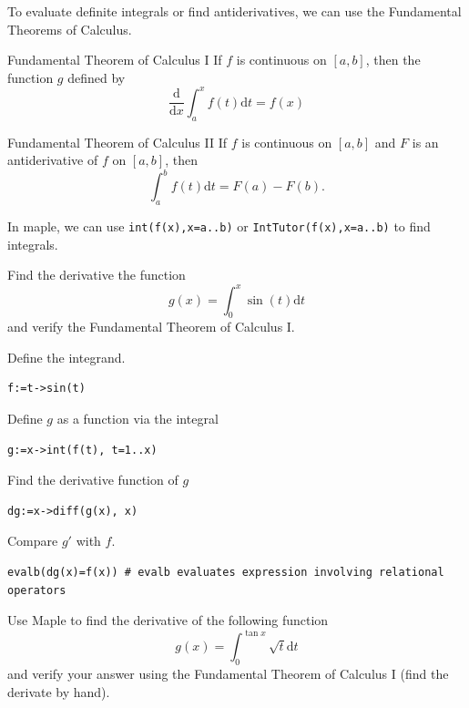 \documentclass[en,11pt,simple]{elegantbook}
\let\BeginKnitrBlock\begin \let\EndKnitrBlock\end
\begin{document}
To evaluate definite integrals or find antiderivatives, we can use the Fundamental Theorems of Calculus.

\BeginKnitrBlock{theorem}{Fundamental Theorem of Calculus I}{}
\protect\hypertarget{thm:unnamed-chunk-138}{}{\label{thm:unnamed-chunk-138} {} }
If \(f\) is continuous on \([a, b]\), then the function \(g\) defined by
\[
\dfrac{\mathrm{d}}{\mathrm{d} x}\int^x_af(t)\mathrm{d} t =f(x)
\]
\EndKnitrBlock{theorem}

\BeginKnitrBlock{theorem}{Fundamental Theorem of Calculus II}{}
\protect\hypertarget{thm:unnamed-chunk-139}{}{\label{thm:unnamed-chunk-139} {} }
If \(f\) is continuous on \([a, b]\) and \(F\) is an antiderivative of \(f\) on \([a, b]\), then
\[
\int^b_af(t)\mathrm{d} t =F(a)-F(b).
\]
\EndKnitrBlock{theorem}

In maple, we can use \texttt{int(f(x),x=a..b)} or \texttt{IntTutor(f(x),x=a..b)} to find integrals.

\BeginKnitrBlock{example}{}{}
\protect\hypertarget{exm:unnamed-chunk-140}{}{\label{exm:unnamed-chunk-140} }
Find the derivative the function
\[
g(x)=\int_0^{x}\sin(t)\mathrm{d} t
\]
and verify the Fundamental Theorem of Calculus I.
\EndKnitrBlock{example}

\BeginKnitrBlock{solution}{}{}
{}
Define the integrand.

\begin{verbatim}
f:=t->sin(t)
\end{verbatim}

Define \(g\) as a function via the integral

\begin{verbatim}
g:=x->int(f(t), t=1..x)
\end{verbatim}

Find the derivative function of \(g\)

\begin{verbatim}
dg:=x->diff(g(x), x)
\end{verbatim}

Compare \(g'\) with \(f\).

\begin{verbatim}
evalb(dg(x)=f(x)) # evalb evaluates expression involving relational operators
\end{verbatim}
\EndKnitrBlock{solution}

\BeginKnitrBlock{exercise}{}{}
\protect\hypertarget{exr:unnamed-chunk-142}{}{\label{exr:unnamed-chunk-142} }
Use Maple to find the derivative of the following function
\[
g(x)=\int_0^{\tan x}\sqrt{t}\mathrm{d} t
\]
and verify your answer using the Fundamental Theorem of Calculus I (find the derivate by hand).
\EndKnitrBlock{exercise}
\end{document}
